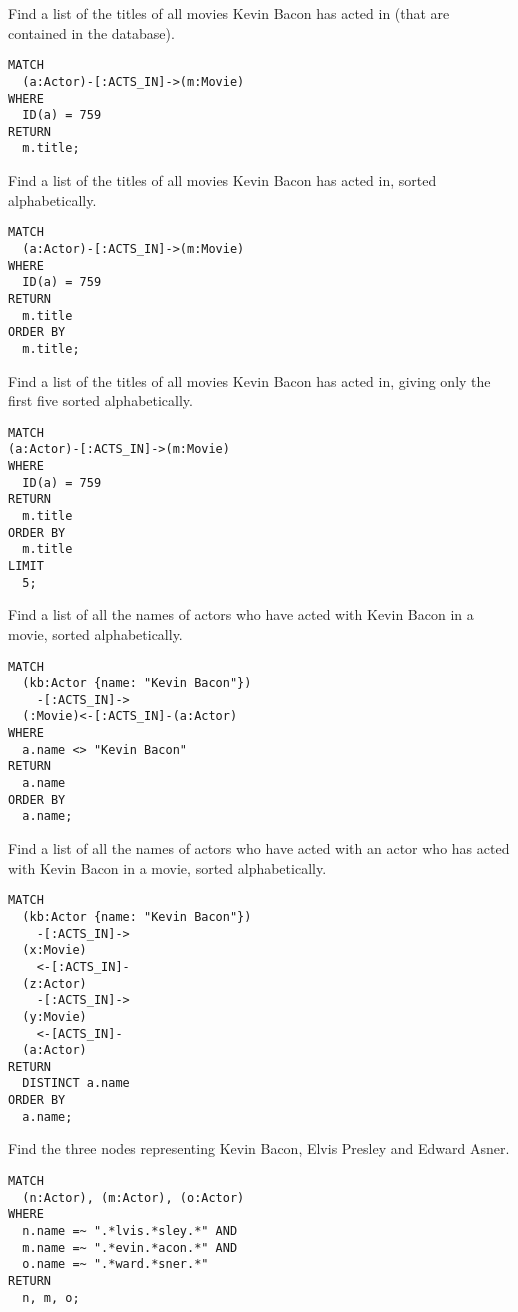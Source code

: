 \documentclass[a4paper, 12pt]{exam}
\begin{document}
\begin{questions}
\question
Find a list of the titles of all movies Kevin Bacon has acted in (that are contained in the database).
\begin{solution}
\begin{verbatim}
MATCH
  (a:Actor)-[:ACTS_IN]->(m:Movie)
WHERE
  ID(a) = 759
RETURN
  m.title;
\end{verbatim}
\end{solution}


\question
Find a list of the titles of all movies Kevin Bacon has acted in, sorted alphabetically.
\begin{solution}
\begin{verbatim}
MATCH
  (a:Actor)-[:ACTS_IN]->(m:Movie)
WHERE
  ID(a) = 759
RETURN
  m.title
ORDER BY
  m.title;
\end{verbatim}
\end{solution}


\question
Find a list of the titles of all movies Kevin Bacon has acted in, giving only the first five sorted alphabetically.
\begin{solution}
\begin{verbatim}
MATCH
(a:Actor)-[:ACTS_IN]->(m:Movie)
WHERE
  ID(a) = 759
RETURN
  m.title
ORDER BY
  m.title
LIMIT
  5;
\end{verbatim}
\end{solution}


\question
Find a list of all the names of actors who have acted with Kevin Bacon in a movie, sorted alphabetically.
\begin{solution}
\begin{verbatim}
MATCH
  (kb:Actor {name: "Kevin Bacon"})
    -[:ACTS_IN]->
  (:Movie)<-[:ACTS_IN]-(a:Actor)
WHERE
  a.name <> "Kevin Bacon"
RETURN
  a.name
ORDER BY
  a.name;
\end{verbatim}
\end{solution}

\question
Find a list of all the names of actors who have acted with an actor who has acted with Kevin Bacon in a movie, sorted alphabetically.
\begin{solution}
  \begin{verbatim}
MATCH
  (kb:Actor {name: "Kevin Bacon"})
    -[:ACTS_IN]->
  (x:Movie)
    <-[:ACTS_IN]-
  (z:Actor)
    -[:ACTS_IN]->
  (y:Movie)
    <-[ACTS_IN]-
  (a:Actor)
RETURN
  DISTINCT a.name
ORDER BY
  a.name;
  \end{verbatim}
\end{solution}


\question
Find the three nodes representing Kevin Bacon, Elvis Presley and Edward Asner.
\begin{solution}
\begin{verbatim}
MATCH
  (n:Actor), (m:Actor), (o:Actor)
WHERE
  n.name =~ ".*lvis.*sley.*" AND 
  m.name =~ ".*evin.*acon.*" AND 		
  o.name =~ ".*ward.*sner.*"
RETURN
  n, m, o;
\end{verbatim}
\end{solution}


\end{questions}
\end{document}
